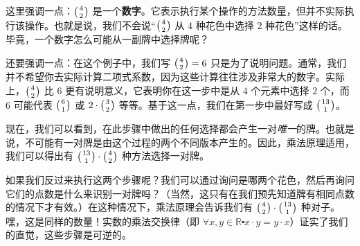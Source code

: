 \begin{example}[一对]
    这里强调一点：$\big({4 \atop 2}\big)$ 是一个\textbf{数字}。它表示执行某个操作的方法数量，但并不实际执行该操作。也就是说，我们不会说``$\big({4 \atop 2}\big)$ 从 $4$ 种花色中选择 $2$ 种花色''这样的话。毕竟，一个数字怎么可能从一副牌中选择牌呢？

    还要强调一点：在这个例子中，我们写 $\big({4 \atop 2}\big) = 6$ 只是为了说明问题。通常，我们并不希望你去实际计算二项式系数，因为这些计算往往涉及非常大的数字。实际上，$\big({4 \atop 2}\big)$ 比 $6$ 更有说明意义，它表明你在这一步中是从 $4$ 个元素中选择 $2$ 个，而 $6$ 可能代表 $\big({6 \atop 1}\big)$ 或 $2 \cdot \big({3 \atop 2}\big)$ 等等。基于这一点，我们在第一步中最好写成 $\big({13 \atop 1}\big)$。

    现在，我们可以看到，在此步骤中做出的任何选择都会产生一对\emph{唯一}的牌。也就是说，不可能有一对牌是由这个过程的两个不同版本产生的。因此，乘法原理适用，我们可以得出有 $\big({13 \atop 1}\big) \cdot \big({4 \atop 2}\big)$ 种方法选择一对牌。

    如果我们反过来执行这两个步骤呢？我们可以通过询问是哪两个花色，然后再询问它们的点数是什么来识别一对牌吗？（当然，这只有在我们预先知道牌有相同点数的情况下才有效。）在这种情况下，乘法原理会告诉我们有 $\big({4 \atop 2}\big) \cdot \big({13 \atop 1}\big)$ 种对子。嘿，这是同样的数量！实数的乘法交换律（即 $\forall x, y \in \mathbb{R} \centerdot x \cdot y = y \cdot x$）证实了我们的直觉，这些步骤是可逆的。


\end{example}
